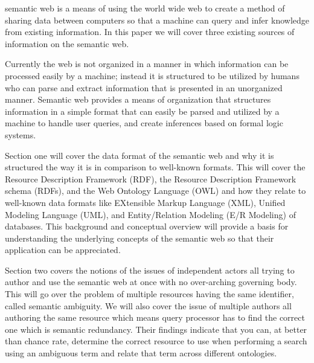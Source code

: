 \documentclass[10pt,journal,compsoc]{IEEEtran}
\begin{document}

 semantic web is a means of using the world wide web to create a method of sharing data between computers so that a machine can query and infer knowledge from existing information. In this paper we will cover three existing sources of information on the semantic web. 

Currently the web is not organized in a manner in which information can be processed easily by a machine; instead it is structured to be utilized by humans who can parse and extract information that is presented in an unorganized manner. Semantic web provides a means of organization that structures information in a simple format that can easily be parsed and utilized by a machine to handle user queries, and create inferences based on formal logic systems.

Section one will cover the data format of the semantic web and why it is structured the way it is in comparison to well-known formats. This will cover the Resource Description Framework (RDF), the Resource Description Framework schema (RDFs), and the Web Ontology Language (OWL) and how they relate to well-known data formats like EXtensible Markup Language (XML), Unified Modeling Language (UML), and Entity/Relation Modeling (E/R Modeling) of databases. This background and conceptual overview will provide a basis for understanding the underlying concepts of the semantic web so that their application can be appreciated.

Section two covers the notions of the issues of independent actors all trying to author and use the semantic web at once with no over-arching governing body. This will go over the problem of multiple resources having the same identifier, called semantic ambiguity. We will also cover the issue of multiple authors all authoring the same resource which means query processor has to find the correct one which is semantic redundancy. Their findings indicate that you can, at better than chance rate, determine the correct resource to use when performing a search using an ambiguous term and relate that term across different ontologies.
\end{document}
